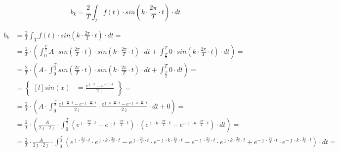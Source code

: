 \begin{task}


\begin{equation}
b_k=\frac{2}{T}\int_{T}f(t) \cdot sin\left( k \cdot \frac{2\pi}{T} \cdot t\right) \cdot dt
\end{equation}


\begin{align*}
b_k&=\frac{2}{T}\int_{T}f(t) \cdot sin\left( k \cdot \frac{2\pi}{T} \cdot t\right) \cdot dt=\\
&=\frac{2}{T}\cdot\left(\int_{0}^{\frac{T}{2}}A \cdot sin\left( \frac{2\pi}{T} \cdot t\right) \cdot sin\left( k \cdot \frac{2\pi}{T} \cdot t\right) \cdot dt+\int_{\frac{T}{2}}^{T} 0 \cdot sin\left( k \cdot \frac{2\pi}{T} \cdot t\right) \cdot dt\right)=\\
&=\frac{2}{T}\cdot\left(A \cdot \int_{0}^{\frac{T}{2}}sin\left( \frac{2\pi}{T} \cdot t\right) \cdot sin\left( k \cdot \frac{2\pi}{T} \cdot t\right) \cdot dt+\int_{\frac{T}{2}}^{T} 0 \cdot dt\right)=\\
&=\begin{Bmatrix*}[l]
sin\left(x\right)&=\frac{e^{\jmath \cdot x}-e^{-\jmath \cdot x}}{2 \jmath }
\end{Bmatrix*}=\\
&=\frac{2}{T}\cdot\left(A \cdot \int_{0}^{\frac{T}{2}} \frac{e^{\jmath \cdot \frac{2\pi}{T} \cdot t}-e^{-\jmath \cdot \frac{2\pi}{T} \cdot t}}{2\jmath} \cdot \frac{e^{\jmath \cdot k \cdot \frac{2\pi}{T} \cdot t}-e^{-\jmath \cdot k \cdot \frac{2\pi}{T} \cdot t}}{2\jmath} \cdot dt+0\right)=\\
&=\frac{2}{T}\cdot\left(\frac{A}{2\jmath\cdot 2\jmath} \cdot \int_{0}^{\frac{T}{2}} \left(e^{\jmath \cdot \frac{2\pi}{T} \cdot t}-e^{-\jmath \cdot \frac{2\pi}{T} \cdot t}\right)\cdot \left(e^{\jmath \cdot k \cdot \frac{2\pi}{T} \cdot t}-e^{-\jmath \cdot k \cdot \frac{2\pi}{T} \cdot t}\right) \cdot dt\right)=\\
&=\frac{2}{T} \cdot \frac{A}{2\jmath\cdot 2\jmath} \cdot \int_{0}^{\frac{T}{2}}
\left(e^{\jmath \cdot \frac{2\pi}{T} \cdot t} \cdot e^{\jmath \cdot k \cdot \frac{2\pi}{T} \cdot t} - e^{\jmath \cdot \frac{2\pi}{T} \cdot t} \cdot e^{-\jmath \cdot k \cdot \frac{2\pi}{T} \cdot t} - e^{-\jmath \cdot \frac{2\pi}{T} \cdot t} \cdot e^{\jmath \cdot k \cdot \frac{2\pi}{T} \cdot t} + e^{-\jmath \cdot \frac{2\pi}{T} \cdot t} \cdot e^{-\jmath \cdot k \cdot \frac{2\pi}{T} \cdot t} \right) \cdot dt=\\

\end{align*}
\end{task}
